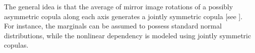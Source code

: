 \documentclass[harvard,11pt]{article}
\begin{document}
 The general idea is that the average of mirror image rotations of a possibly asymmetric copula along each axis generates a jointly symmetric copula [see \citet{oh2016high}]. For instance, the marginals can be assumed to possess standard normal distributions, while the nonlinear dependency is modeled using jointly symmetric copulas. %
\end{document}

